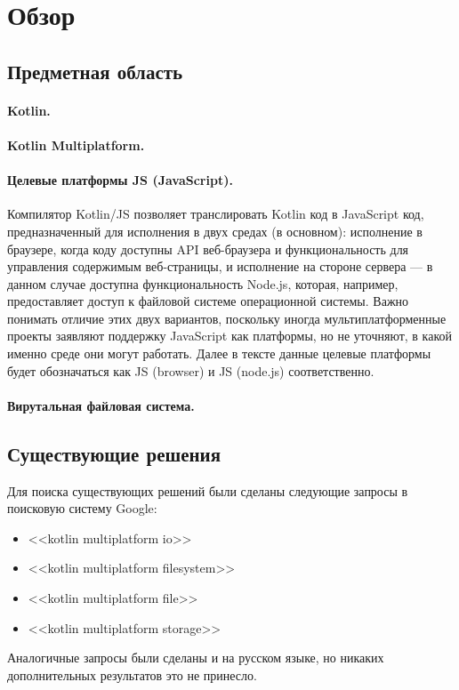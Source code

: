 \section{Обзор}

\subsection{Предметная область}

    \paragraph{Kotlin.} \todo{}

    \paragraph{Kotlin Multiplatform\cite{kotlin-multiplatform}.} \todo{}

    \paragraph{Целевые платформы JS (JavaScript).} Компилятор Kotlin/JS\cite{kotlin-js} позволяет транслировать Kotlin код в JavaScript код, предназначенный для исполнения в двух средах (в основном): исполнение в браузере, когда коду доступны API веб-браузера и функциональность для управления содержимым веб-страницы, и исполнение на стороне сервера --- в данном случае доступна функциональность Node.js, которая, например, предоставляет доступ к файловой системе операционной системы\cite{nodejs-browser-diff}. Важно понимать отличие этих двух вариантов, поскольку иногда мультиплатформенные проекты заявляют поддержку JavaScript как платформы, но не уточняют, в какой именно среде они могут работать. Далее в тексте данные целевые платформы будет обозначаться как JS (browser) и JS (node.js) соответственно.

    \paragraph{Вирутальная файловая система.} \todo{}

\subsection{Существующие решения}
    Для поиска существующих решений были сделаны следующие запросы в поисковую систему Google:
    \begin{itemize}
        \item <<kotlin multiplatform io>>
        \item <<kotlin multiplatform filesystem>>
        \item <<kotlin multiplatform file>>
        \item <<kotlin multiplatform storage>>
    \end{itemize}
    Аналогичные запросы были сделаны и на русском языке, но никаких дополнительных результатов это не принесло.

